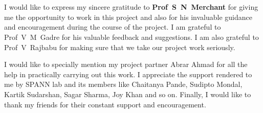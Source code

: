 \chapter*{}
I would like to express my sincere gratitude to \textbf{Prof~S~N~Merchant}
for giving me the opportunity to work in this project and also for his
invaluable guidance and encouragement during the course of the project. I am
grateful to Prof~V~M~Gadre for his valuable feedback and suggestions. I am
also grateful to Prof~V~Rajbabu for making sure that we take our project work
seriously. 

I would like to specially mention my project partner Abrar Ahmad 
for all the help in practically carrying out this work. I appreciate the 
support rendered to me by SPANN lab and its members like Chaitanya Pande, 
Sudipto Mondal, Kartik Sudarshan, Sagar Sharma, Joy Khan and so on. Finally,
I would like to thank my friends for their constant support and
encouragement.